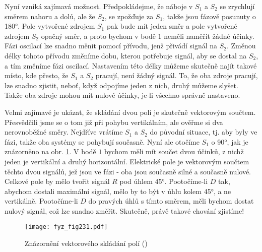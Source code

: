{    Nyní vzniká zajímavá možnost. Předpokládejme, že náboje v \(S_1\) a \(S_2\) se zrychlují směrem 
    nahoru a dolů, ale že \(S_2\), se zpožďuje za \(S_1\), takže jsou fázově posunuty o \ang{180}. 
    Pole vytvořené zdrojem \(S_1\) pak bude mít jeden směr a pole vytvořené zdrojem \(S_2\) opačný 
    směr, a proto bychom v bodě \(1\) neměli naměřit žádné účinky. Fázi oscilací lze snadno měnit 
    pomocí přívodu, jenž přivádí signál na \(S_2\). Změnou délky tohoto přívodu změníme dobu, 
    kterou potřebuje signál, aby se dostal na \(S_2\), a tím změníme fázi oscilací. Nastavením této 
    délky můžeme skutečně najít takové místo, kde přesto, že \(S_1\) a \(S_2\) pracují, není žádný 
    signál. To, že oba zdroje pracují, lze snadno zjistit, neboť, když odpojíme jeden z nich, druhý 
    můžeme slyšet. Takže oba zdroje mohou mít nulové účinky, je-li všechno správně nastaveno.
    
    Velmi zajímavé je ukázat, že skládání dvou polí je skutečně vektorovým součtem. Přesvědčili 
    jsme se o tom již při pohybu vertikálním, ale ověřme si dva nerovnoběžné směry. Nejdříve 
    vrátíme \(S_1\) a \(S_2\) do původní situace, tj. aby byly ve fázi, takže oba systémy se 
    pohybují současně. Nyní ale otočíme \(S_1\) o \ang{90}, jak je znázorněno na obr. 
    \ref{fyz:fig231}. V bodě \(1\) bychom měli mít součet dvou účinků, z nichž jeden je vertikální 
    a druhý horizontální. Elektrické pole je vektorovým součtem těchto dvou signálů, jež jsou ve 
    fázi - oba jsou současně silné a současně nulové. Celkové pole by mělo tvořit signál \(R\) pod 
    úhlem \ang{45}. Pootočíme-li \(D\) tak, abychom dostali maximální signál, mělo by to být v úhlu 
    kolem \ang{45}, a ne vertikálně. Pootočíme-li \(D\) do pravých úhlů s tímto směrem, měli bychom 
    dostat nulový signál, což lze snadno změřit. Skutečně, právě takové chování zjistíme!
    
    \begin{figure}[ht!] %
      \centering
      \texttt{[image: fyz\_fig231.pdf]}
      \caption{Znázornění vektorového skládání polí
               (\cite[s.~377]{Feynman01})}
      \label{fyz:fig231}
    \end{figure}
    
}
